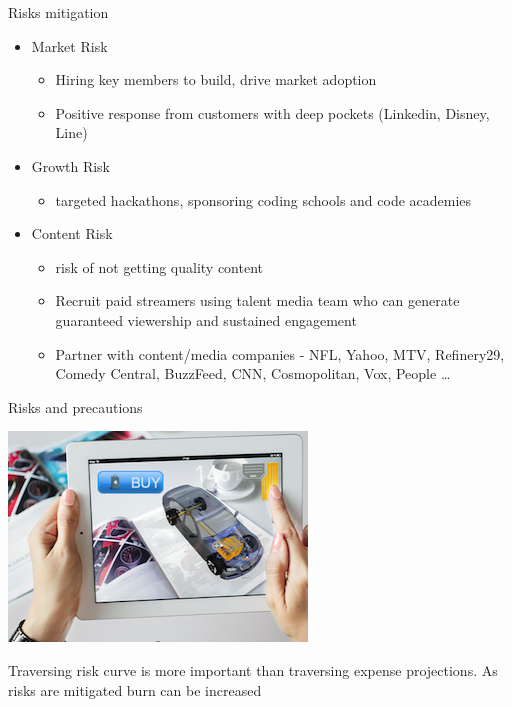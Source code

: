 \documentclass[12pt]{beamer}
\begin{document}
\begin{frame}[fragile]{Risks mitigation}
 \begin{itemize}[<+-| alert@+>]
\item[ ]Market Risk
\begin{itemize}[<+-| alert@+>]
\item Hiring key members to build, drive market adoption
\item Positive response from customers with deep pockets (Linkedin, Disney, Line) 
\end{itemize}

\item[ ]Growth Risk
\begin{itemize}[<+-| alert@+>]
\item targeted hackathons, sponsoring coding schools and code academies
\end{itemize}

\item[ ]Content Risk
\begin{itemize}[<+-| alert@+>]
\item risk of not getting quality content
\item Recruit paid streamers using talent media team who can generate guaranteed viewership and sustained engagement
\item Partner with content/media companies - NFL, Yahoo, MTV, Refinery29, Comedy Central, BuzzFeed, CNN, Cosmopolitan, Vox, People \ldots
\end{itemize}

\end{itemize}
\end{frame}
\begin{frame}[standout]
 Risks and precautions

\includegraphics[scale=.2]{static/arad/arad5}

 Traversing risk curve is more important than traversing expense projections. As risks are mitigated burn can be increased 


 
\end{frame}
\end{document}
